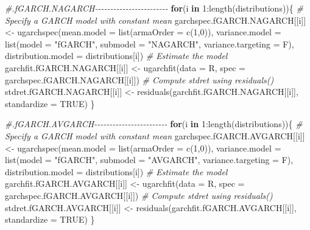 \documentclass[a4paper, twoside]{templates/ociamthesis}
\newenvironment{Shaded}{\begin{snugshade}}{\end{snugshade}}
\newcommand{\AttributeTok}[1]{\textcolor[rgb]{0.77,0.63,0.00}{#1}}
\newcommand{\CommentTok}[1]{\textcolor[rgb]{0.56,0.35,0.01}{\textit{#1}}}
\newcommand{\ConstantTok}[1]{\textcolor[rgb]{0.00,0.00,0.00}{#1}}
\newcommand{\ControlFlowTok}[1]{\textcolor[rgb]{0.13,0.29,0.53}{\textbf{#1}}}
\newcommand{\DecValTok}[1]{\textcolor[rgb]{0.00,0.00,0.81}{#1}}
\newcommand{\FunctionTok}[1]{\textcolor[rgb]{0.00,0.00,0.00}{#1}}
\newcommand{\NormalTok}[1]{#1}
\newcommand{\OtherTok}[1]{\textcolor[rgb]{0.56,0.35,0.01}{#1}}
\newcommand{\SpecialCharTok}[1]{\textcolor[rgb]{0.00,0.00,0.00}{#1}}
\newcommand{\StringTok}[1]{\textcolor[rgb]{0.31,0.60,0.02}{#1}}
\renewenvironment{Shaded}
{
  \vspace{10pt}%
  \begin{snugshade}%
}{%
  \end{snugshade}%
  \vspace{8pt}%
}
\begin{document}
\begin{Shaded}
\begin{Highlighting}[]
\CommentTok{\#.fGARCH.NAGARCH{-}{-}{-}{-}{-}{-}{-}{-}{-}{-}{-}{-}{-}{-}{-}{-}{-}{-}{-}{-}{-}{-}{-}{-}}
\ControlFlowTok{for}\NormalTok{(i }\ControlFlowTok{in} \DecValTok{1}\SpecialCharTok{:}\FunctionTok{length}\NormalTok{(distributions))\{}
\CommentTok{\# Specify a GARCH model with constant mean}
\NormalTok{garchspec.fGARCH.NAGARCH[[i]] }\OtherTok{\textless{}{-}} \FunctionTok{ugarchspec}\NormalTok{(}\AttributeTok{mean.model =} \FunctionTok{list}\NormalTok{(}\AttributeTok{armaOrder =} \FunctionTok{c}\NormalTok{(}\DecValTok{1}\NormalTok{,}\DecValTok{0}\NormalTok{)),}
                     \AttributeTok{variance.model =} \FunctionTok{list}\NormalTok{(}\AttributeTok{model =} \StringTok{"fGARCH"}\NormalTok{, }\AttributeTok{submodel =} \StringTok{"NAGARCH"}\NormalTok{, }\AttributeTok{variance.targeting =}\NormalTok{ F),}
                     \AttributeTok{distribution.model =}\NormalTok{ distributions[i])}
\CommentTok{\# Estimate the model}
\NormalTok{garchfit.fGARCH.NAGARCH[[i]] }\OtherTok{\textless{}{-}} \FunctionTok{ugarchfit}\NormalTok{(}\AttributeTok{data =}\NormalTok{ R, }\AttributeTok{spec =}\NormalTok{ garchspec.fGARCH.NAGARCH[[i]])}
\CommentTok{\# Compute stdret using residuals()}
\NormalTok{stdret.fGARCH.NAGARCH[[i]] }\OtherTok{\textless{}{-}} \FunctionTok{residuals}\NormalTok{(garchfit.fGARCH.NAGARCH[[i]], }\AttributeTok{standardize =} \ConstantTok{TRUE}\NormalTok{)}
\NormalTok{\}}

\CommentTok{\#.fGARCH.AVGARCH{-}{-}{-}{-}{-}{-}{-}{-}{-}{-}{-}{-}{-}{-}{-}{-}{-}{-}{-}{-}{-}{-}{-}{-}}
\ControlFlowTok{for}\NormalTok{(i }\ControlFlowTok{in} \DecValTok{1}\SpecialCharTok{:}\FunctionTok{length}\NormalTok{(distributions))\{}
\CommentTok{\# Specify a GARCH model with constant mean}
\NormalTok{garchspec.fGARCH.AVGARCH[[i]] }\OtherTok{\textless{}{-}} \FunctionTok{ugarchspec}\NormalTok{(}\AttributeTok{mean.model =} \FunctionTok{list}\NormalTok{(}\AttributeTok{armaOrder =} \FunctionTok{c}\NormalTok{(}\DecValTok{1}\NormalTok{,}\DecValTok{0}\NormalTok{)),}
                     \AttributeTok{variance.model =} \FunctionTok{list}\NormalTok{(}\AttributeTok{model =} \StringTok{"fGARCH"}\NormalTok{, }\AttributeTok{submodel =} \StringTok{"AVGARCH"}\NormalTok{, }\AttributeTok{variance.targeting =}\NormalTok{ F),}
                     \AttributeTok{distribution.model =}\NormalTok{ distributions[i])}
\CommentTok{\# Estimate the model}
\NormalTok{garchfit.fGARCH.AVGARCH[[i]] }\OtherTok{\textless{}{-}} \FunctionTok{ugarchfit}\NormalTok{(}\AttributeTok{data =}\NormalTok{ R, }\AttributeTok{spec =}\NormalTok{ garchspec.fGARCH.AVGARCH[[i]])}
\CommentTok{\# Compute stdret using residuals()}
\NormalTok{stdret.fGARCH.AVGARCH[[i]] }\OtherTok{\textless{}{-}} \FunctionTok{residuals}\NormalTok{(garchfit.fGARCH.AVGARCH[[i]], }\AttributeTok{standardize =} \ConstantTok{TRUE}\NormalTok{)}
\NormalTok{\}}


\end{Highlighting}
\end{Shaded}
\end{document}
